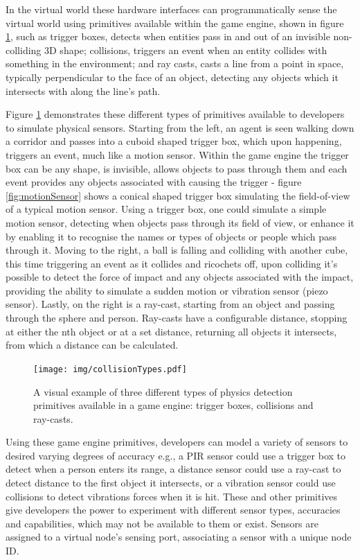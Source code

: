 In the virtual world these hardware interfaces can programmatically sense the virtual world using primitives available within the game engine, shown in figure \ref{fig:collisionTypes}, such as trigger boxes, detects when entities pass in and out of an invisible non-colliding 3D shape; collisions, triggers an event when an entity collides with something in the environment; and ray casts, casts a line from a point in space, typically perpendicular to the face of an object, detecting any objects which it intersects with along the line's path. 

Figure \ref{fig:collisionTypes} demonstrates these different types of primitives available to developers to simulate physical sensors. Starting from the left, an agent is seen walking down a corridor and passes into a cuboid shaped trigger box, which upon happening, triggers an event, much like a motion sensor. Within the game engine the trigger box can be any shape, is invisible, allows objects to pass through them and each event provides any objects associated with causing the trigger - figure \ref{fig:motionSensor} shows a conical shaped trigger box simulating the field-of-view of a typical motion sensor. Using a trigger box, one could simulate a simple motion sensor, detecting when objects pass through its field of view, or enhance it by enabling it to recognise the names or types of objects or people which pass through it. Moving to the right, a ball is falling and colliding with another cube, this time triggering an event as it collides and ricochets off, upon colliding it's possible to detect the force of impact and any objects associated with the impact, providing the ability to simulate a sudden motion or vibration sensor (piezo sensor). Lastly, on the right is a ray-cast, starting from an object and passing through the sphere and person. Ray-casts have a configurable distance, stopping at either the nth object or at a set distance, returning all objects it intersects, from which a distance can be calculated.

\begin{figure}[tbh]
  \centering
  \texttt{[image: img/collisionTypes.pdf]}
  \caption{A visual example of three different types of physics detection primitives available in a game engine: trigger boxes, collisions and ray-casts.}
  \label{fig:collisionTypes}
\end{figure}

Using these game engine primitives, developers can model a variety of sensors to desired varying degrees of accuracy e.g., a PIR sensor could use a trigger box to detect when a person enters its range, a distance sensor could use a ray-cast to detect distance to the first object it intersects, or a vibration sensor could use collisions to detect vibrations forces when it is hit. These and other primitives give developers the power to experiment with different sensor types, accuracies and capabilities, which may not be available to them or exist. Sensors are assigned to a virtual node's sensing port, associating a sensor with a unique node ID.

